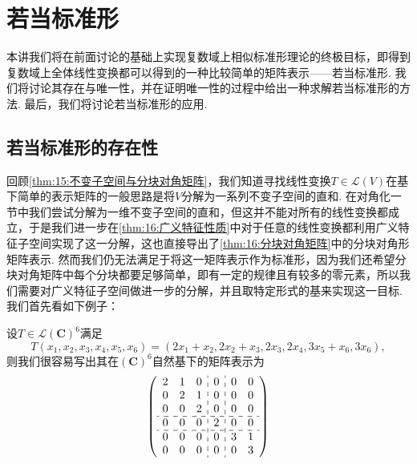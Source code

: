 \chapter{若当标准形}

本讲我们将在前面讨论的基础上实现复数域上相似标准形理论的终极目标，即得到复数域上全体线性变换都可以得到的一种比较简单的矩阵表示——若当标准形. 我们将讨论其存在与唯一性，并在证明唯一性的过程中给出一种求解若当标准形的方法. 最后，我们将讨论若当标准形的应用.

\section{若当标准形的存在性}
回顾\autoref{thm:15:不变子空间与分块对角矩阵}，我们知道寻找线性变换$T\in\mathcal{L}(V)$在基下简单的表示矩阵的一般思路是将$V$分解为一系列不变子空间的直和. 在对角化一节中我们尝试分解为一维不变子空间的直和，但这并不能对所有的线性变换都成立，于是我们进一步在\autoref{thm:16:广义特征性质}中对于任意的线性变换都利用广义特征子空间实现了这一分解，这也直接导出了\autoref{thm:16:分块对角矩阵}中的分块对角形矩阵表示. 然而我们仍无法满足于将这一矩阵表示作为标准形，因为我们还希望分块对角矩阵中每个分块都要足够简单，即有一定的规律且有较多的零元素，所以我们需要对广义特征子空间做进一步的分解，并且取特定形式的基来实现这一目标. 我们首先看如下例子：

\begin{example}
    设$T\in\mathcal{L}(\mathbf{C})^6$满足
    \[T(x_1,x_2,x_3,x_4,x_5,x_6)=(2x_1+x_2,2x_2+x_3,2x_3,2x_4,3x_5+x_6,3x_6),\]
    则我们很容易写出其在$(\mathbf{C})^6$自然基下的矩阵表示为
    \[\left(\begin{array}{ccc:c:cc}
        2 & 1 & 0 & 0 & 0 & 0\\
        0 & 2 & 1 & 0 & 0 & 0\\
        0 & 0 & 2 & 0 & 0 & 0\\
        \hdashline
        0 & 0 & 0 & 2 & 0 & 0\\
        \hdashline
        0 & 0 & 0 & 0 & 3 & 1\\
        0 & 0 & 0 & 0 & 0 & 3\\
        \end{array}\right)\]
\end{example}

